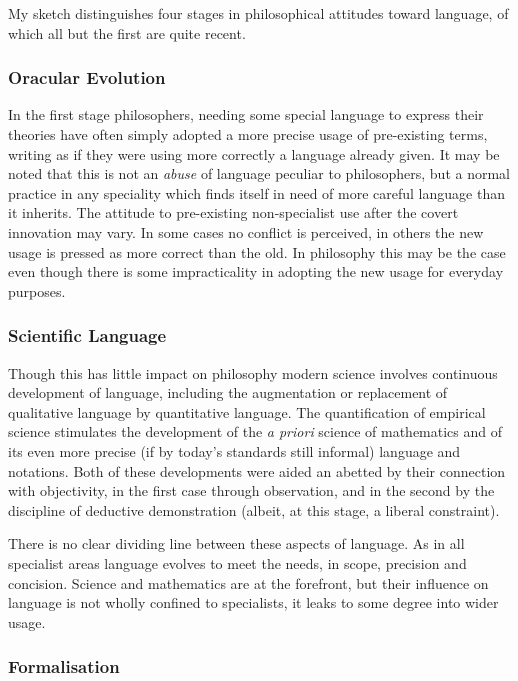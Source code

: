 My sketch distinguishes four stages in philosophical attitudes toward language, of which all but the first are quite recent.

\subsubsection{Oracular Evolution}

In the first stage philosophers, needing some special language to express their theories have often simply adopted a more precise usage of pre-existing terms, writing as if they were using more correctly a language already given.
It may be noted that this is not an {\it abuse} of language peculiar to philosophers, but a normal practice in any speciality which finds itself in need of more careful language than it inherits.
The attitude to pre-existing non-specialist use after the covert innovation may vary.
In some cases no conflict is perceived, in others the new usage is pressed as more correct than the old.
In philosophy this may be the case even though there is some impracticality in adopting the new usage for everyday purposes.

\subsubsection{Scientific Language}

Though this has little impact on philosophy modern science involves continuous development of language, including the augmentation or replacement of qualitative language by quantitative language.
The quantification of empirical science stimulates the development of the {\it a priori} science of mathematics and of its even more precise (if by today's standards still informal) language and notations.
Both of these developments were aided an abetted by their connection with objectivity, in the first case through observation, and in the second by the discipline of deductive demonstration (albeit, at this stage, a liberal constraint).

There is no clear dividing line between these aspects of language.
As in all specialist areas language evolves to meet the needs, in scope, precision and concision.
Science and mathematics are at the forefront, but their influence on language is not wholly confined to specialists, it leaks to some degree into wider usage.

\subsubsection{Formalisation}

